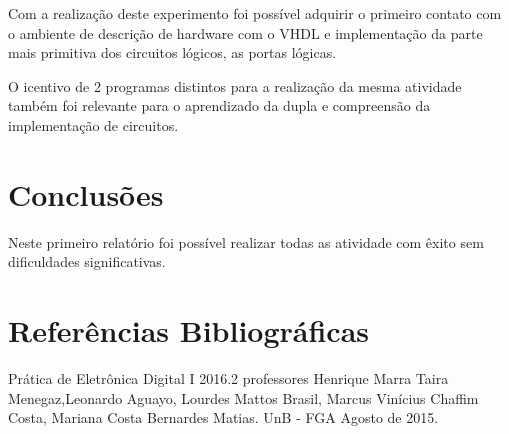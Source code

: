 \documentclass[12pts]{article}
\begin{document}
	Com a realização deste experimento foi possível adquirir o primeiro contato com o ambiente de descrição de hardware com o VHDL e implementação da parte mais primitiva dos circuitos lógicos, as portas lógicas.
	
	O icentivo de 2 programas distintos para a realização da mesma atividade também foi relevante para o aprendizado da dupla e compreensão da implementação de circuitos.

\section{Conclusões}
\iffalse
Conclusões, mostrando os êxitos e eventuais problemas encontrados na realização do experimento, indicando as limitações, apresentando recomendações e/ou sugestões.
\fi

	Neste primeiro relatório foi possível realizar todas as atividade com êxito sem dificuldades significativas.

\section{Referências Bibliográficas}
\iffalse
Referencias Bibliográficas, relacionadas e citadas de acordo com as normas da ABNT.
\fi
Prática de Eletrônica Digital I 2016.2 professores Henrique Marra Taira Menegaz,Leonardo Aguayo, Lourdes Mattos Brasil, Marcus Vinícius Chaffim Costa, Mariana Costa Bernardes Matias. UnB - FGA Agosto de 2015.

\iffalse
\section{Diagramas Esquemáticos}
Diagramas Esquemáticos. Todos os diagramas devem ser inseridos ao final do relatório em páginas separadas do texto, indicando a identificação do circuito, autor, revisor, versão e datas relevantes.
\fi
\newpage
\end{document}
